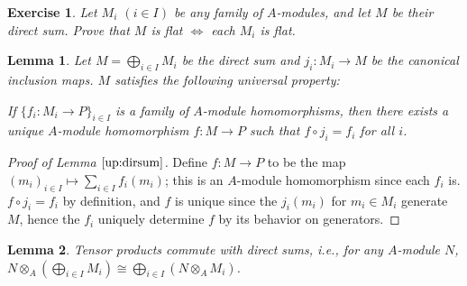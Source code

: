 \documentclass[12pt,letterpaper]{article}
\newtheorem{problem}{Exercise}[section]
\newtheorem{lemma}{Lemma}%
\theoremstyle{definition}
\theoremstyle{remark}
\numberwithin{figure}{problem}
\numberwithin{equation}{section}
\begin{document}
\begin{problem}\label{exc:2.4}
  Let $M_i$ $(i \in I)$ be any family of $A$-modules, and let $M$ be their direct sum. Prove that $M$ is flat $\Leftrightarrow$ each $M_i$ is flat.
\end{problem}
\begin{lemma}\label{up:dirsum}
  Let $M = \bigoplus_{i \in I} M_i$ be the direct sum and $j_i\colon M_i \to M$ be the canonical inclusion maps. $M$ satisfies the following universal property:
  \par If $\{f_i \colon M_i \to P\}_{i \in I}$ is a family of $A$-module homomorphisms, then there exists a unique $A$-module homomorphism $f\colon M \to P$ such that $f \circ j_i = f_i$ for all $i$.
\end{lemma}
\begin{proof}[Proof of Lemma $\ref{up:dirsum}$]
  Define $f \colon M \to P$ to be the map $(m_i)_{i \in I} \mapsto \sum_{i \in I} f_i(m_i)$; this is an $A$-module homomorphism since each $f_i$ is. $f \circ j_i = f_i$ by definition, and $f$ is unique since the $j_i(m_i)$ for $m_i \in M_i$ generate $M$, hence the $f_i$ uniquely determine $f$ by its behavior on generators.
\end{proof}
\begin{lemma}\label{l2.4}
  Tensor products commute with direct sums, i.e., for any $A$-module $N$, $N \otimes_A \left(\bigoplus_{i \in I} M_i\right) \cong \bigoplus_{i \in I}(N \otimes_A M_i)$.
\end{lemma}
\end{document}
